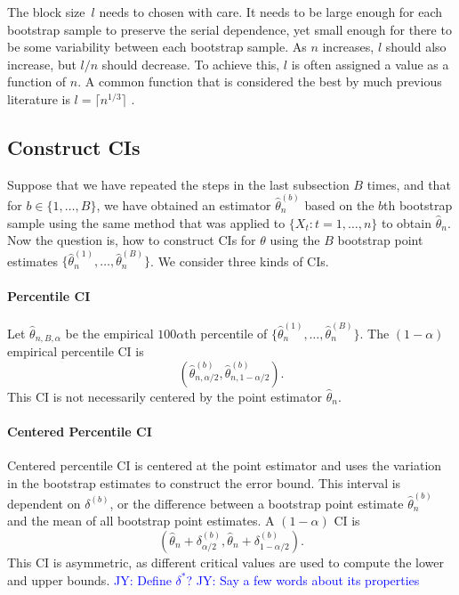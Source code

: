 \documentclass[12pt, letterpaper, titlepage]{article}
\newcommand{\jy}[1]{\textcolor{blue}{JY: #1}}
\begin{document}
The block size~$l$ needs to chosen with care. It needs to be large enough for
each bootstrap sample to preserve the serial dependence, yet small enough for
there to be some variability between each bootstrap sample. As $n$ increases,
$l$ should also increase, but $l / n$ should decrease. To achieve this, $l$ is
often assigned a value as a function of $n$. A common function that is
considered the best by much previous literature is $l = \lceil n^{1/3} \rceil$
\citep{buhlmann1999block}.


\subsection{Construct CIs}

Suppose that we have repeated the steps in the last subsection $B$ times, and
that for $b \in \{1, \ldots, B\}$, we have obtained an estimator
$\hat\theta_n^{(b)}$ based on the $b$th bootstrap sample using the same method
that was applied to $\{X_t: t = 1, \ldots, n\}$ to obtain $\hat\theta_n$.
Now the question is, how to construct CIs for $\theta$
using the $B$ bootstrap point estimates
$\{\hat\theta_n^{(1)}, \ldots, \hat\theta_n^{(B)}\}$.
We consider three kinds of CIs.


\paragraph{Percentile CI}
Let $\hat\theta_{n, B, \alpha}$ be the empirical $100\alpha$th percentile of
$\{\hat\theta_n^{(1)}, \ldots, \hat\theta_n^{(B)}\}$. The $(1 - \alpha)$
empirical percentile CI is
\[
(\hat\theta_{n, \alpha/2}^{(b)}, \hat\theta_{n, 1 - \alpha/2}^{(b)}).
\]
This CI is not necessarily centered by the point estimator $\hat\theta_n$.


\paragraph{Centered Percentile CI}
Centered percentile CI is centered at the point estimator and uses the
variation
in the bootstrap estimates to construct the error bound. This interval is
dependent on $\delta^{(b)}$, or the difference between a bootstrap point
estimate $\hat\theta_n^{(b)}$ and
the mean of all bootstrap point estimates.
 A $(1 - \alpha)$ CI is
\[
(\hat{\theta}_{n} + \delta^{(b)}_{\alpha/2},
\hat{\theta}_{n} + \delta^{(b)}_{1 - \alpha/2}).
\]
This CI is asymmetric, as different critical values are used to compute
the lower and upper bounds.
\jy{Define $\delta^*$?}
\jy{Say a few words about its properties}
\end{document}

